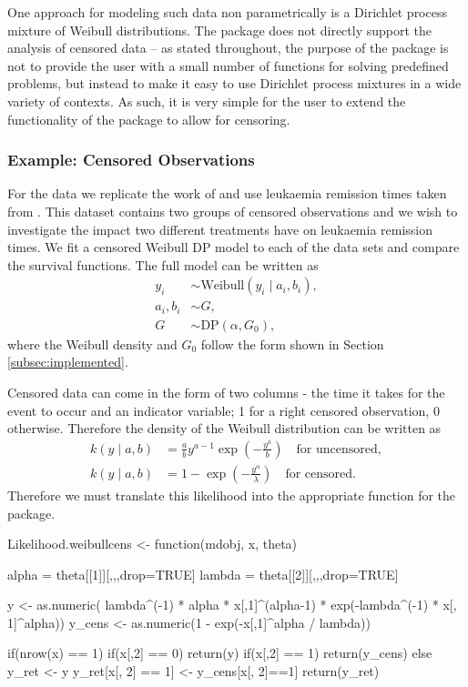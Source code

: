 \documentclass[nojss]{jss}
\begin{document}
One approach for modeling such data non parametrically is a Dirichlet process mixture of Weibull distributions. The  package does not directly support the analysis of censored data -- as stated throughout, the purpose of the package is not to provide the user with a small number of functions for solving predefined problems, but instead to make it easy to use Dirichlet process mixtures in a wide variety of contexts. As such, it is very simple for the user to extend the functionality of the package to allow for censoring.

\subsubsection{Example: Censored Observations}

For the data we replicate the work of \cite{kottas_nonparametric_2006} and use leukaemia remission times taken from \cite{lawless_statistical_2011}. This dataset contains two groups of censored observations and we wish to investigate the impact two different treatments have on leukaemia remission times. We fit a censored Weibull DP model to each of the data sets and compare the survival functions. The full model can be written as
\begin{align*}
y _i & \sim \text{Weibull} ( y_i \mid a_i , b_i ), \\
a_i , b_i & \sim G, \\
G & \sim  \text{DP} (\alpha , G_0),
\end{align*}
where the Weibull density and $G_0$ follow the form shown in Section \ref{subsec:implemented}.

Censored data can come in the form of two columns - the time it takes for the event to occur and an indicator variable; 1 for a right censored observation, 0 otherwise. Therefore the density of the Weibull distribution can be written as
\begin{align*}
k(y \mid a , b) & = \frac{a}{b} y ^{a-1}  \exp \left( -  \frac{y^a}{b}  \right) \quad \text{for uncensored}, \\
k(y \mid a , b) & = 1 - \exp \left( -\frac{y^\alpha}{\lambda} \right) \quad \text{for censored}.
\end{align*}
Therefore we must translate this likelihood into the appropriate function for the  package.

\begin{CodeInput}
Likelihood.weibullcens <- function(mdobj, x, theta){
  alpha = theta[[1]][,,,drop=TRUE]
  lambda = theta[[2]][,,,drop=TRUE]

  y <- as.numeric(
  lambda^(-1) * alpha * x[,1]^(alpha-1) * exp(-lambda^(-1) * x[, 1]^alpha))
  y_cens <- as.numeric(1 - exp(-x[,1]^alpha / lambda))

  if(nrow(x) == 1){
    if(x[,2] == 0) return(y)
    if(x[,2] == 1) return(y_cens)
  }
  else{
    y_ret <- y
    y_ret[x[, 2] == 1] <- y_cens[x[, 2]==1]
    return(y_ret)
  }
}
\end{CodeInput}
\end{document}
